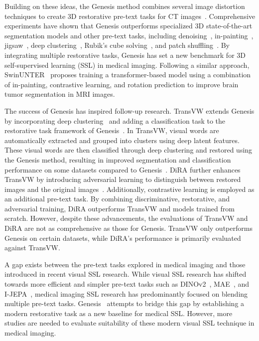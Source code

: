 \documentclass[a4paper,11pt,oneside]{report}
\begin{document}
Building on these ideas, the Genesis method combines several image distortion techniques to create 3D restorative pre-text tasks for CT images~\cite{Zhou2021}. Comprehensive experiments have shown that Genesis outperforms specialized 3D state-of-the-art segmentation models and other pre-text tasks, including denoising~\cite{Vincent2010}, in-painting~\cite{Pathak2016}, jigsaw~\cite{Noroozi2016}, deep clustering~\cite{Caron2018}, Rubik's cube solving~\cite{Zhuang2019}, and patch shuffling~\cite{Chen2019}. By integrating multiple restorative tasks, Genesis has set a new benchmark for 3D self-supervised learning (SSL) in medical imaging.  Following a similar approach, SwinUNTER~\cite{Tang2022} proposes training a transformer-based model using a combination of in-painting, contrastive learning, and rotation prediction to improve brain tumor segmentation in MRI images.

The success of Genesis has inspired follow-up research. TransVW extends Genesis by incorporating deep clustering~\cite{Caron2018} and adding a classification task to the restorative task framework of Genesis~\cite{Zhou2021}. In TransVW, visual words are automatically extracted and grouped into clusters using deep latent features. These visual words are then classified through deep clustering and restored using the Genesis method, resulting in improved segmentation and classification performance on some datasets compared to Genesis~\cite{Haghighi2021}. DiRA further enhances TransVW by introducing adversarial learning to distinguish between restored images and the original images~\cite{Haghighi2024}. Additionally, contrastive learning is employed as an additional pre-text task. By combining discriminative, restorative, and adversarial training, DiRA outperforms TransVW and models trained from scratch. However, despite these advancements, the evaluations of TransVW and DiRA are not as comprehensive as those for Genesis. TransVW only outperforms Genesis on certain datasets, while DiRA's performance is primarily evaluated against TransVW.

A gap exists between the pre-text tasks explored in medical imaging and those introduced in recent visual SSL research. While visual SSL research has shifted towards more efficient and simpler pre-text tasks such as DINOv2~\cite{Oquab2024dinov}, MAE~\cite{He2022}, and I-JEPA~\cite{Assran2023}, medical imaging SSL research has predominantly focused on blending multiple pre-text tasks. Genesis~\cite{Zhou2021} attempts to bridge this gap by establishing a modern restorative task as a new baseline for medical SSL. However, more studies are needed to evaluate suitability of these modern visual SSL technique in medical imaging. 
\end{document}
